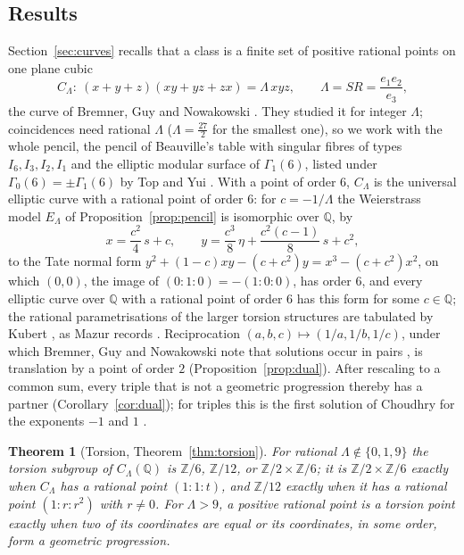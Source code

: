 \documentclass[11pt]{amsart}
\newtheorem{introthm}{Theorem}
\theoremstyle{definition}
\theoremstyle{remark}
\newcommand{\Q}{\mathbb{Q}}
\newcommand{\Z}{\mathbb{Z}}
\begin{document}
\subsection{Results}
Section~\ref{sec:curves} recalls that a class is a finite set of positive rational points on one plane cubic
\[
  C_\Lambda:\ (x+y+z)(xy+yz+zx)=\Lambda\,xyz,\qquad \Lambda=SR=\frac{e_1e_2}{e_3},
\]
the curve of Bremner, Guy and Nowakowski \cite{bgn1993}. They studied it for integer $\Lambda$; coincidences need rational $\Lambda$ ($\Lambda=\frac{27}2$ for the smallest one), so we work with the whole pencil, the pencil of Beauville's table with singular fibres of types $I_6,I_3,I_2,I_1$ \cite[Th\'eor\`eme and Tableau, p.~658]{beauville1982} and the elliptic modular surface of $\Gamma_1(6)$, listed under $\Gamma_0(6)=\pm\Gamma_1(6)$ by Top and Yui \cite[Table~2]{topyui2007}. With a point of order $6$, $C_\Lambda$ is the universal elliptic curve with a rational point of order $6$: for $c=-1/\Lambda$ the Weierstrass model $E_\Lambda$ of Proposition~\ref{prop:pencil} is isomorphic over $\Q$, by
\[
  x=\frac{c^2}4\,s+c,\qquad y=\frac{c^3}8\,\eta+\frac{c^2(c-1)}8\,s+c^2,
\]
to the Tate normal form $y^2+(1-c)xy-(c+c^2)y=x^3-(c+c^2)x^2$, on which $(0,0)$, the image of $(0:1:0)=-(1:0:0)$, has order $6$, and every elliptic curve over $\Q$ with a rational point of order $6$ has this form for some $c\in\Q$; the rational parametrisations of the larger torsion structures are tabulated by Kubert \cite{kubert1976}, as Mazur records \cite[p.~156]{mazur1977}. Reciprocation $(a,b,c)\mapsto(1/a,1/b,1/c)$, under which Bremner, Guy and Nowakowski note that solutions occur in pairs \cite[p.~117]{bgn1993}, is translation by a point of order $2$ (Proposition~\ref{prop:dual}). After rescaling to a common sum, every triple that is not a geometric progression thereby has a partner (Corollary~\ref{cor:dual}); for triples this is the first solution of Choudhry for the exponents $-1$ and $1$ \cite[\S4.1, p.~748]{choudhry2011}.

\begin{introthm}[Torsion, Theorem~\ref{thm:torsion}]\label{thm:T}
For rational $\Lambda\notin\{0,1,9\}$ the torsion subgroup of $C_\Lambda(\Q)$ is $\Z/6$, $\Z/12$, or $\Z/2\times\Z/6$; it is $\Z/2\times\Z/6$ exactly when $C_\Lambda$ has a rational point $(1:1:t)$, and $\Z/12$ exactly when it has a rational point $(1:r:r^2)$ with $r\ne0$. For $\Lambda>9$, a positive rational point is a torsion point exactly when two of its coordinates are equal or its coordinates, in some order, form a geometric progression.
\end{introthm}
\end{document}
